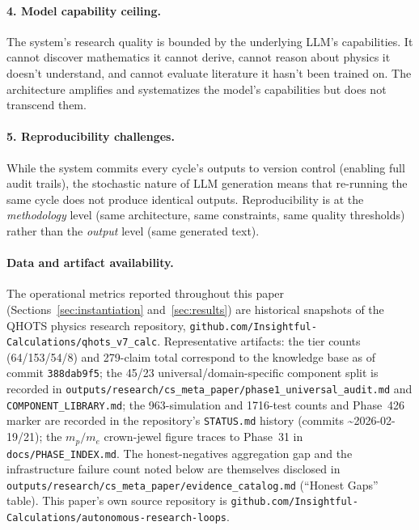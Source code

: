 \documentclass[11pt,a4paper]{article}
\newcommand{\qhots}{\textsc{QHOTS}}
\begin{document}
\paragraph{4. Model capability ceiling.}
The system's research quality is bounded by the underlying LLM's capabilities.
It cannot discover mathematics it cannot derive, cannot reason about physics
it doesn't understand, and cannot evaluate literature it hasn't been trained on.
The architecture amplifies and systematizes the model's capabilities but does
not transcend them.

\paragraph{5. Reproducibility challenges.}
While the system commits every cycle's outputs to version control (enabling
full audit trails), the stochastic nature of LLM generation means that re-running
the same cycle does not produce identical outputs. Reproducibility is at the
\emph{methodology} level (same architecture, same constraints, same quality
thresholds) rather than the \emph{output} level (same generated text).

\paragraph{Data and artifact availability.}
The operational metrics reported throughout this paper (Sections~\ref{sec:instantiation}
and~\ref{sec:results}) are historical snapshots of the \qhots{} physics research
repository, \texttt{github.com/Insightful-Calculations/qhots\_v7\_calc}. Representative
artifacts: the tier counts (64/153/54/8) and 279-claim total correspond to the knowledge
base as of commit \texttt{388dab9f5}; the 45/23 universal/domain-specific component split
is recorded in \texttt{outputs/research/cs\_meta\_paper/phase1\_universal\_audit.md} and
\texttt{COMPONENT\_LIBRARY.md}; the 963-simulation and 1716-test counts and Phase~426
marker are recorded in the repository's \texttt{STATUS.md} history (commits
\textasciitilde 2026-02-19/21); the $m_p/m_e$ crown-jewel figure traces to Phase~31 in
\texttt{docs/PHASE\_INDEX.md}. The honest-negatives aggregation gap and the infrastructure
failure count noted below are themselves disclosed in
\texttt{outputs/research/cs\_meta\_paper/evidence\_catalog.md} (``Honest Gaps'' table).
This paper's own source repository is
\texttt{github.com/Insightful-Calculations/autonomous-research-loops}.

\end{document}
